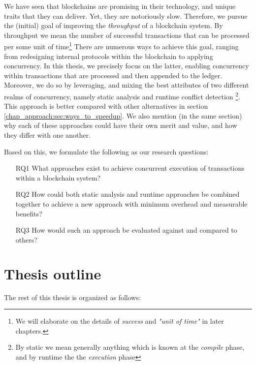 We have seen that blockchains are promising in their technology, and unique traits that they can
deliver. Yet, they are notoriously slow. Therefore, we  pursue the (initial) goal of improving the
\textit{throughput} of a blockchain system. By throughput we mean the number of successful
transactions that can be processed per some unit of time\footnote{We will elaborate on the details
of \textit{success} and \textit{"unit of time"} in later chapters.} There are numerous ways to
achieve this goal, ranging from redesigning internal protocols within the blockchain to applying
concurrency. In this thesis, we precisely focus on the latter, enabling concurrency within
transactions that are processed and then appended to the ledger. Moreover, we do so by leveraging,
and mixing the best attributes of two different realms of concurrency, namely static analysis and
runtime conflict detection \footnote{By static we mean generally anything which is known at the
\textit{compile} phase, and by runtime the the \textit{execution} phase}. This approach is better
compared with other alternatives in section \ref{chap_approach:sec:ways_to_speedup}. We also mention
(in the same section) why each of these approaches could have their own merit and value, and how
they differ with one another.

Based on this, we formulate the following as our research questions:

 \begin{enumerate}
     \item [RQ1] What approaches exist to achieve concurrent execution of transactions within a
     blockchain system?
	 \item [RQ2] How could both static analysis and runtime approaches be combined together to
	 achieve a new approach with minimum overhead and measurable benefits?
	 \item [RQ3] How would such an approach be evaluated against and compared to others?
 \end{enumerate}

\section{Thesis outline}
The rest of this thesis is organized as follows: 

